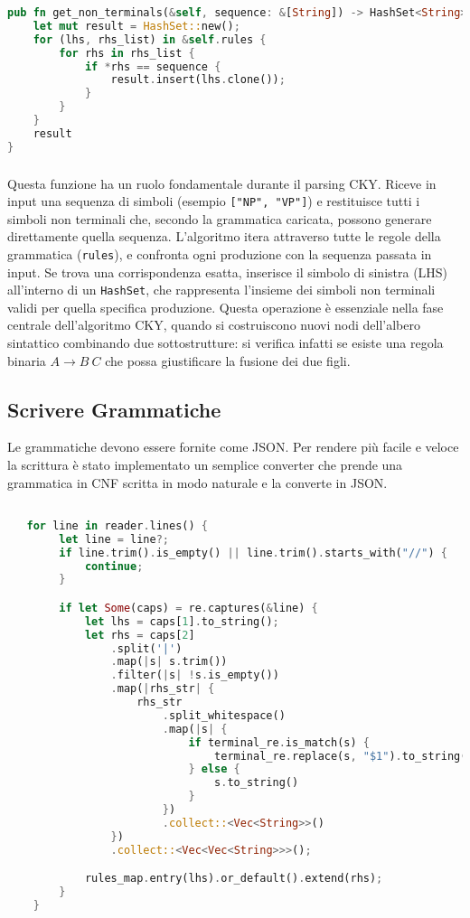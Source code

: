 \begin{lstlisting}[language=rust, caption = Ricerca delle produzioni inverse nella grammatica]
pub fn get_non_terminals(&self, sequence: &[String]) -> HashSet<String> {
    let mut result = HashSet::new();
    for (lhs, rhs_list) in &self.rules {
        for rhs in rhs_list {
            if *rhs == sequence {
                result.insert(lhs.clone());
            }
        }
    }
    result
}
\end{lstlisting}
\subsubsection{}
Questa funzione ha un ruolo fondamentale durante il parsing CKY. Riceve in input una sequenza di simboli (esempio \texttt{["NP", "VP"]}) e restituisce tutti i simboli non terminali che, secondo la grammatica caricata, possono generare direttamente quella sequenza.
L’algoritmo itera attraverso tutte le regole della grammatica (\texttt{rules}), e confronta ogni produzione con la sequenza passata in input. Se trova una corrispondenza esatta, inserisce il simbolo di sinistra (LHS) all’interno di un \texttt{HashSet}, che rappresenta l’insieme dei simboli non terminali validi per quella specifica produzione.
Questa operazione è essenziale nella fase centrale dell'algoritmo CKY, quando si costruiscono nuovi nodi dell'albero sintattico combinando due sottostrutture: si verifica infatti se esiste una regola binaria $A \rightarrow B\ C$ che possa giustificare la fusione dei due figli.
\subsection{Scrivere Grammatiche}

Le grammatiche devono essere fornite come JSON. Per rendere più facile e veloce la scrittura è stato implementato un semplice converter che prende una grammatica in CNF scritta in modo naturale e la converte in JSON.

\begin{lstlisting}[language=rust, caption = Converter]

   for line in reader.lines() {
        let line = line?;
        if line.trim().is_empty() || line.trim().starts_with("//") {
            continue;
        }

        if let Some(caps) = re.captures(&line) {
            let lhs = caps[1].to_string();
            let rhs = caps[2]
                .split('|')
                .map(|s| s.trim())
                .filter(|s| !s.is_empty())
                .map(|rhs_str| {
                    rhs_str
                        .split_whitespace()
                        .map(|s| {
                            if terminal_re.is_match(s) {
                                terminal_re.replace(s, "$1").to_string()
                            } else {
                                s.to_string()
                            }
                        })
                        .collect::<Vec<String>>()
                })
                .collect::<Vec<Vec<String>>>();

            rules_map.entry(lhs).or_default().extend(rhs);
        }
    }

\end{lstlisting}

